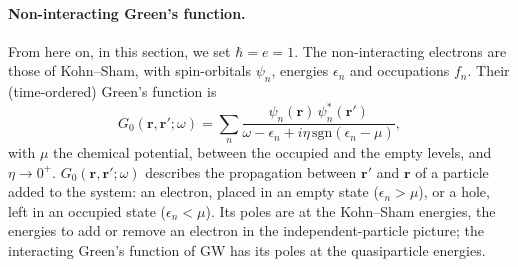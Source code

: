 \documentclass[10pt,a4paper]{paper}
\begin{document}
\paragraph{Non-interacting Green's function.} From here on, in this section, we set $\hbar = e = 1$. The non-interacting electrons
are those of Kohn--Sham, with
spin-orbitals $\psi_n$, energies $\epsilon_n$ and occupations $f_n$. Their (time-ordered) Green's function
is~\cite{golze2019gw}
\begin{equation}
G_0(\bm{r},\bm{r}';\omega) = \sum_n \frac{\psi_n(\bm{r})\,\psi_n^*(\bm{r}')}
{\omega - \epsilon_n + i\eta\,\mathrm{sgn}(\epsilon_n - \mu)} ,
\label{eq:G0}
\end{equation}
with $\mu$ the chemical potential, between the occupied and the empty levels, and $\eta \to 0^+$.
$G_0(\bm{r},\bm{r}';\omega)$ describes the propagation between $\bm{r}'$ and $\bm{r}$ of a particle added to the
system: an electron, placed in an empty state ($\epsilon_n > \mu$), or a hole, left in an occupied state
($\epsilon_n < \mu$). Its poles are at the Kohn--Sham energies, the energies to add or remove an electron in the
independent-particle picture; the interacting Green's function of GW has its poles at the quasiparticle energies.
\end{document}
